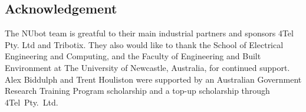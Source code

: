 \documentclass{llncs}
\begin{document}








\subsection*{Acknowledgement} The NUbot team is greatful to their main industrial partners and sponsors 4Tel Pty. Ltd and Tribotix. They also would like to thank the School of Electrical Engineering and Computing, and the Faculty of Engineering and Built Environment at The University of Newcastle, Australia, for continued support. Alex Biddulph and Trent Houliston were supported by an Australian Government Research Training Program scholarship and a top-up scholarship through 4Tel~Pty.~Ltd.




\end{document}
